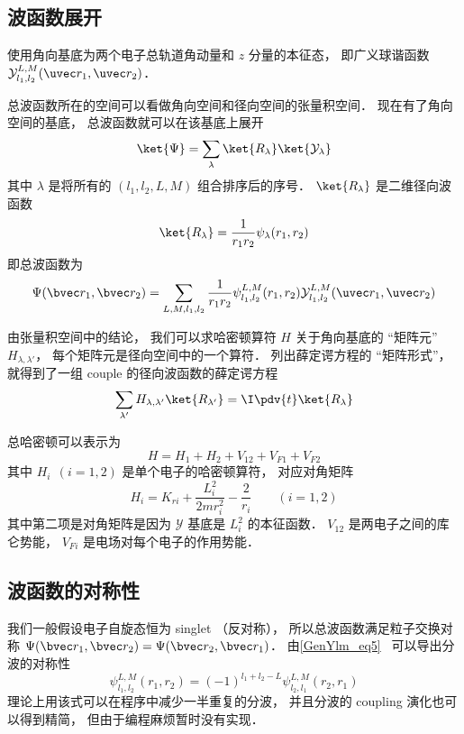 \subsection{波函数展开}
使用角向基底为两个电子总轨道角动量和 $z$ 分量的本征态， 即广义球谐函数 $\mathcal{Y}_{l_1,l_2}^{L,M}(\uvec r_1, \uvec r_2)$．

总波函数所在的空间可以看做角向空间和径向空间的张量积空间． 现在有了角向空间的基底， 总波函数就可以在该基底上展开
\begin{equation}
\ket{\Psi} = \sum_\lambda \ket{R_\lambda}\ket{\mathcal{Y_\lambda}}
\end{equation}
其中 $\lambda$ 是将所有的 $(l_1,l_2,L,M)$ 组合排序后的序号． $\ket{R_\lambda}$ 是二维径向波函数
\begin{equation}
\ket{R_\lambda} = \frac{1}{r_1 r_2} \psi_\lambda(r_1, r_2)
\end{equation}
即总波函数为
\begin{equation}\label{HeTDSE_eq2}
\Psi(\bvec r_1, \bvec r_2) = \sum_{L, M, l_1, l_2}  \frac{1}{r_1 r_2} \psi_{l_1, l_2}^{L, M}(r_1, r_2)\mathcal{Y}_{l_1, l_2}^{L, M}(\uvec r_1, \uvec r_2)
\end{equation}

由张量积空间中的结论， 我们可以求哈密顿算符 $H$ 关于角向基底的 “矩阵元” $H_{\lambda, \lambda'}$， 每个矩阵元是径向空间中的一个算符． 列出薛定谔方程的 “矩阵形式”， 就得到了一组 couple 的径向波函数的薛定谔方程
\begin{equation}
\sum_{\lambda'} H_{\lambda, \lambda'} \ket{R_{\lambda'}} = \I \pdv{t} \ket{R_{\lambda}}
\end{equation}

总哈密顿可以表示为
\begin{equation}
H = H_1 + H_2 + V_{12} + V_{F1} + V_{F2}
\end{equation}
其中 $H_i \ \ (i = 1, 2)$ 是单个电子的哈密顿算符， 对应对角矩阵
\begin{equation}
H_i = K_{ri} + \frac{L_i^2}{2m r_i^2} - \frac{2}{r_i} \qquad (i = 1,2)
\end{equation}
其中第二项是对角矩阵是因为 $\mathcal Y$ 基底是 $L_i^2$ 的本征函数． $V_{12}$ 是两电子之间的库仑势能， $V_{Fi}$ 是电场对每个电子的作用势能．

\subsection{波函数的对称性}
我们一般假设电子自旋态恒为 singlet （反对称）， 所以总波函数满足粒子交换对称 $\Psi(\bvec r_1, \bvec r_2) = \Psi(\bvec r_2, \bvec r_1)$． 由\autoref{GenYlm_eq5}~ 可以导出分波的对称性
\begin{equation}\label{HeTDSE_eq1}
\psi_{l_1, l_2}^{L, M}(r_1, r_2) = (-1)^{l_1 + l_2 - L} \psi_{l_2, l_1}^{L, M}(r_2, r_1)
\end{equation}
理论上用该式可以在程序中减少一半重复的分波， 并且分波的 coupling 演化也可以得到精简， 但由于编程麻烦暂时没有实现．

